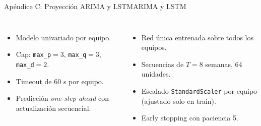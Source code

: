 \documentclass[aspectratio=169,11pt]{beamer}
\begin{document}
\begin{frame}{Ap\'endice C: Proyecci\'on ARIMA y LSTM}{ARIMA y LSTM}
	\vspace*{-0.6cm}
	\begin{columns}[T,onlytextwidth]
		\par\vskip 2mm
		\footnotesize
		\begin{itemize}
			\item Modelo univariado por equipo.
			\item Cap: \texttt{max\_p}$=3$, \texttt{max\_q}$=3$, \texttt{max\_d}$=2$.
			\item Timeout de 60 s por equipo.
			\item Predicci\'on \textit{one-step ahead} con actualizaci\'on secuencial.
		\end{itemize}
		\par\vskip 2mm
		\footnotesize
		\begin{itemize}
			\item Red \'unica entrenada sobre todos los equipos.
			\item Secuencias de $T = 8$ semanas, 64 unidades.
			\item Escalado \texttt{StandardScaler} por equipo (ajustado solo en train).
			\item Early stopping con paciencia 5.
		\end{itemize}
	\end{columns}
	\vskip 1mm
\end{frame}
\end{document}
